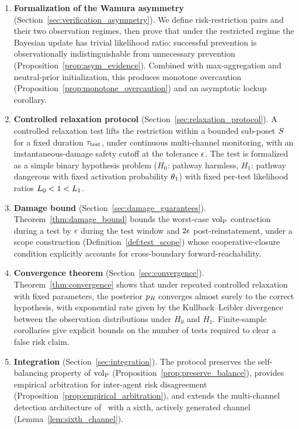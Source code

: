 \begin{enumerate}
\item \textbf{Formalization of the Wamura asymmetry}
  (Section~\ref{sec:verification_asymmetry}).
  We define risk-restriction pairs and their two observation
  regimes, then prove that under the restricted regime the
  Bayesian update has trivial likelihood ratio: successful
  prevention is observationally indistinguishable from unnecessary
  prevention (Proposition~\ref{prop:asym_evidence}).  Combined
  with max-aggregation and neutral-prior initialization, this
  produces monotone overcaution
  (Proposition~\ref{prop:monotone_overcaution}) and an asymptotic
  lockup corollary.

\item \textbf{Controlled relaxation protocol}
  (Section~\ref{sec:relaxation_protocol}).
  A controlled relaxation test lifts the restriction within a
  bounded sub-poset $S$ for a fixed duration $\tau_{\mathrm{test}}$,
  under continuous multi-channel monitoring, with an
  instantaneous-damage safety cutoff at the tolerance
  $\epsilon$.  The test is formalized as a simple binary
  hypothesis problem ($H_0$: pathway harmless, $H_1$: pathway
  dangerous with fixed activation probability $\theta_1$) with
  fixed per-test likelihood ratios $L_0 < 1 < L_1$.

\item \textbf{Damage bound}
  (Section~\ref{sec:damage_guarantees}).
  Theorem~\ref{thm:damage_bound} bounds the worst-case ${\operatorname{vol}_{\mathrm{P}}}$
  contraction during a test by $\epsilon$ during the test
  window and $2\epsilon$ post-reinstatement, under a scope
  construction (Definition~\ref{def:test_scope}) whose
  cooperative-closure condition explicitly accounts for
  cross-boundary forward-reachability.

\item \textbf{Convergence theorem}
  (Section~\ref{sec:convergence}).
  Theorem~\ref{thm:convergence} shows that under repeated
  controlled relaxation with fixed parameters, the posterior
  $p_R$ converges almost surely to the correct hypothesis, with
  exponential rate given by the Kullback--Leibler divergence
  between the observation distributions under $H_0$ and $H_1$.
  Finite-sample corollaries give explicit bounds on the number of
  tests required to clear a false risk claim.

\item \textbf{Integration}
  (Section~\ref{sec:integration}).
  The protocol preserves the self-balancing property of ${\operatorname{vol}_{\mathrm{P}}}$
  (Proposition~\ref{prop:preserve_balance}), provides empirical
  arbitration for inter-agent risk disagreement
  (Proposition~\ref{prop:empirical_arbitration}), and extends the
  multi-channel detection architecture
  of~\citep{lasser2026scm} with a sixth, actively generated
  channel (Lemma~\ref{lem:sixth_channel}).
\end{enumerate}

